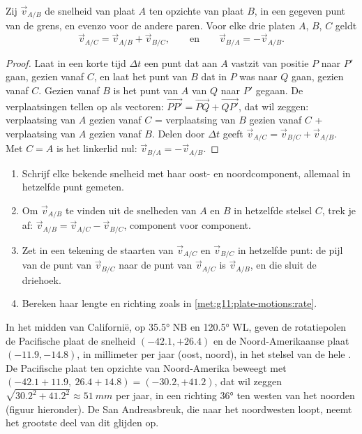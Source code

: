 \begin{proposition}\label{prop:g11:plate-motions:sum}
Zij $\vec v_{A/B}$ de snelheid van plaat $A$ ten opzichte van plaat $B$, in een
gegeven punt van de grens, en evenzo voor de andere paren. Voor elke drie
platen $A$, $B$, $C$ geldt
\[
  \vec v_{A/C} = \vec v_{A/B} + \vec v_{B/C},
  \qquad\text{en}\qquad
  \vec v_{B/A} = -\vec v_{A/B}.
\]
\end{proposition}

\begin{proof}
Laat in een korte tijd $\Delta t$ een punt dat aan $A$ vastzit van positie $P$
naar $P'$ gaan, gezien vanaf $C$, en laat het punt van $B$ dat in $P$ was naar
$Q$ gaan, gezien vanaf $C$. Gezien vanaf $B$ is het punt van $A$ van $Q$ naar
$P'$ gegaan. De verplaatsingen tellen op als vectoren:
$\overrightarrow{PP'} = \overrightarrow{PQ} + \overrightarrow{QP'}$, dat wil zeggen:
verplaatsing van $A$ gezien vanaf $C$ = verplaatsing van $B$ gezien vanaf $C$ +
verplaatsing van $A$ gezien vanaf $B$. Delen door $\Delta t$ geeft $\vec v_{A/C}
= \vec v_{B/C} + \vec v_{A/B}$. Met $C = A$ is het linkerlid nul: $\vec
v_{B/A} = -\vec v_{A/B}$.
\end{proof}

\begin{method}\label{met:g11:plate-motions:triangle}
\begin{enumerate}
  \item Schrijf elke bekende snelheid met haar oost- en noordcomponent, allemaal
        in hetzelfde punt gemeten.
  \item Om $\vec v_{A/B}$ te vinden uit de snelheden van $A$ en $B$ in hetzelfde
        stelsel $C$, trek je af: $\vec v_{A/B} = \vec v_{A/C} - \vec v_{B/C}$,
        component voor component.
  \item Zet in een tekening de staarten van $\vec v_{A/C}$ en $\vec v_{B/C}$ in
        hetzelfde punt: de pijl van de punt van $\vec v_{B/C}$ naar de punt van
        $\vec v_{A/C}$ is $\vec v_{A/B}$, en die sluit de driehoek.
  \item Bereken haar lengte en richting zoals in
        \cref{met:g11:plate-motions:rate}.
\end{enumerate}
\end{method}

\begin{example}\label{ex:g11:plate-motions:san-andreas}
In het midden van Californië, op \ang{35.5} NB en \ang{120.5} WL, geven de
rotatiepolen de Pacifische plaat de snelheid $(-42.1, +26.4)$ en de
Noord-Amerikaanse plaat $(-11.9, -14.8)$, in millimeter per jaar (oost, noord), in
het stelsel van de hele . De Pacifische plaat ten opzichte van Noord-Amerika
beweegt met $(-42.1 + 11.9,\ 26.4 + 14.8) = (-30.2, +41.2)$, dat wil zeggen
$\sqrt{30.2^2 + 41.2^2} \approx \qty{51}{mm}$ per jaar, in een richting
\ang{36} ten westen van het noorden (figuur hieronder). De San
Andreasbreuk, die naar het noordwesten loopt, neemt het grootste deel van dit glijden op.
\end{example}

